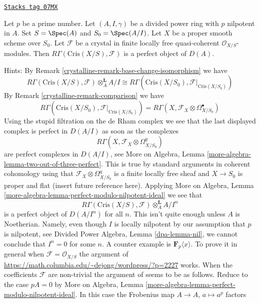 \begin{remark}[Perfectness]

\label{crystalline-remark-perfect}
\href{https://stacks.math.columbia.edu/tag/07MX}{\texttt{Stacks tag 07MX}}

Let $p$ be a prime number. Let $(A, I, \gamma)$ be a divided power
ring with $p$ nilpotent in $A$. Set $S = \Spec(A)$ and
$S_0 = \Spec(A/I)$. Let $X$ be a proper smooth scheme over $S_0$.
Let $\mathcal{F}$ be a crystal in finite locally free
quasi-coherent $\mathcal{O}_{X/S}$-modules.
Then $R\Gamma(\text{Cris}(X/S), \mathcal{F})$ is a
perfect object of $D(A)$.

\medskip\noindent
Hints: By Remark \ref{crystalline-remark-base-change-isomorphism} we have
$$
R\Gamma(\text{Cris}(X/S), \mathcal{F}) \otimes_A^\mathbf{L} A/I
\cong
R\Gamma(\text{Cris}(X/S_0), \mathcal{F}|_{\text{Cris}(X/S_0)})
$$
By Remark \ref{crystalline-remark-comparison} we have
$$
R\Gamma(\text{Cris}(X/S_0), \mathcal{F}|_{\text{Cris}(X/S_0)}) =
R\Gamma(X, \mathcal{F}_X \otimes \Omega^\bullet_{X/S_0})
$$
Using the stupid filtration on the de Rham complex we see that
the last displayed complex is perfect in $D(A/I)$ as soon as the complexes
$$
R\Gamma(X, \mathcal{F}_X \otimes \Omega^q_{X/S_0})
$$
are perfect complexes in $D(A/I)$, see
More on Algebra, Lemma \ref{more-algebra-lemma-two-out-of-three-perfect}.
This is true by standard arguments
in coherent cohomology using that $\mathcal{F}_X \otimes \Omega^q_{X/S_0}$
is a finite locally free sheaf and $X \to S_0$ is proper and flat
(insert future reference here). Applying
More on Algebra, Lemma \ref{more-algebra-lemma-perfect-modulo-nilpotent-ideal}
we see that
$$
R\Gamma(\text{Cris}(X/S), \mathcal{F}) \otimes_A^\mathbf{L} A/I^n
$$
is a perfect object of $D(A/I^n)$ for all $n$. This isn't quite enough
unless $A$ is Noetherian. Namely, even though $I$ is locally nilpotent
by our assumption that $p$ is nilpotent, see
Divided Power Algebra, Lemma \ref{dpa-lemma-nil},
we cannot conclude that $I^n = 0$ for some $n$. A counter example
is $\mathbf{F}_p\langle x \rangle$. To prove it in general when
$\mathcal{F} = \mathcal{O}_{X/S}$ the argument of
\url{https://math.columbia.edu/~dejong/wordpress/?p=2227}
works. When the coefficients $\mathcal{F}$ are non-trivial the
argument of \cite{Faltings-very} seems to be as follows. Reduce to the
case $pA = 0$ by More on Algebra, Lemma
\ref{more-algebra-lemma-perfect-modulo-nilpotent-ideal}.
In this case the Frobenius map $A \to A$, $a \mapsto a^p$ factors

\end{remark}
